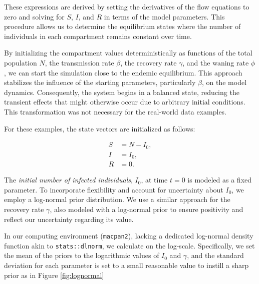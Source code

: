 \documentclass[
11pt, %
oneside, %
english, %
singlespacing, %
]{macthesis} %
\begin{document}
These expressions are derived by setting the derivatives of the flow equations to zero and solving for \(S\), \(I\), and \(R\) in terms of the model parameters. This procedure allows us to determine the equilibrium states where the number of individuals in each compartment remains constant over time.

By initializing the compartment values deterministically as functions of the total population \(N\), the transmission rate \(\beta\), the recovery rate \(\gamma\), and the waning rate \(\phi\), we can start the simulation close to the endemic equilibrium. This approach stabilizes the influence of the starting parameters, particularly \(\beta\), on the model dynamics. Consequently, the system begins in a balanced state, reducing the transient effects that might otherwise occur due to arbitrary initial conditions. This transformation was not necessary for the real-world data examples.

For these examples, the state vectors are initialized as follows:

\[
\begin{aligned}
S &= N - I_0, \\
I &= I_0, \\
R &= 0.
\end{aligned}
\]

The \emph{initial number of infected individuals}, \(I_0\), at time \(t=0\) is modeled as a fixed parameter. To incorporate flexibility and account for uncertainty about \(I_0\), we employ a log-normal prior distribution. We use a similar approach for the recovery rate \(\gamma\), also modeled with a log-normal prior to ensure positivity and reflect our uncertainty regarding its value.

In our computing environment (\texttt{macpan2}), lacking a dedicated log-normal density function akin to \texttt{stats::dlnorm}, we calculate on the log-scale. Specifically, we set the mean of the priors to the logarithmic values of \(I_0\) and \(\gamma\), and the standard deviation for each parameter is set to a small reasonable value to instill a sharp prior as in Figure \ref{fig:lognormal}
\end{document}
